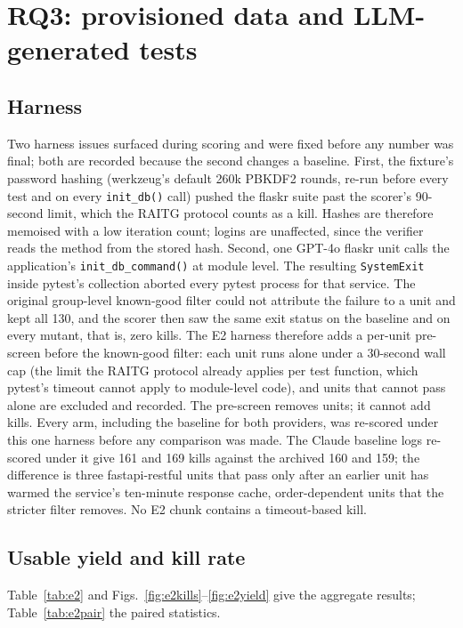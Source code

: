 \documentclass[preprint,12pt]{elsarticle}
\begin{document}
\section{RQ3: provisioned data and LLM-generated tests}
\label{sec:rq3}

\subsection{Harness}
Two harness issues surfaced during scoring and were fixed before any number was final; both are recorded because the second changes a baseline. First, the fixture's password hashing (werkzeug's default 260k PBKDF2 rounds, re-run before every test and on every \texttt{init\_db()} call) pushed the flaskr suite past the scorer's 90-second limit, which the RAITG protocol counts as a kill. Hashes are therefore memoised with a low iteration count; logins are unaffected, since the verifier reads the method from the stored hash. Second, one GPT-4o flaskr unit calls the application's \texttt{init\_db\_command()} at module level. The resulting \texttt{SystemExit} inside pytest's collection aborted every pytest process for that service. The original group-level known-good filter could not attribute the failure to a unit and kept all 130, and the scorer then saw the same exit status on the baseline and on every mutant, that is, zero kills. The E2 harness therefore adds a per-unit pre-screen before the known-good filter: each unit runs alone under a 30-second wall cap (the limit the RAITG protocol already applies per test function, which pytest's timeout cannot apply to module-level code), and units that cannot pass alone are excluded and recorded. The pre-screen removes units; it cannot add kills. Every arm, including the baseline for both providers, was re-scored under this one harness before any comparison was made. The Claude baseline logs re-scored under it give 161 and 169 kills against the archived 160 and 159; the difference is three fastapi-restful units that pass only after an earlier unit has warmed the service's ten-minute response cache, order-dependent units that the stricter filter removes. No E2 chunk contains a timeout-based kill.

\subsection{Usable yield and kill rate}
Table~\ref{tab:e2} and Figs.~\ref{fig:e2kills}--\ref{fig:e2yield} give the aggregate results; Table~\ref{tab:e2pair} the paired statistics.
\end{document}
